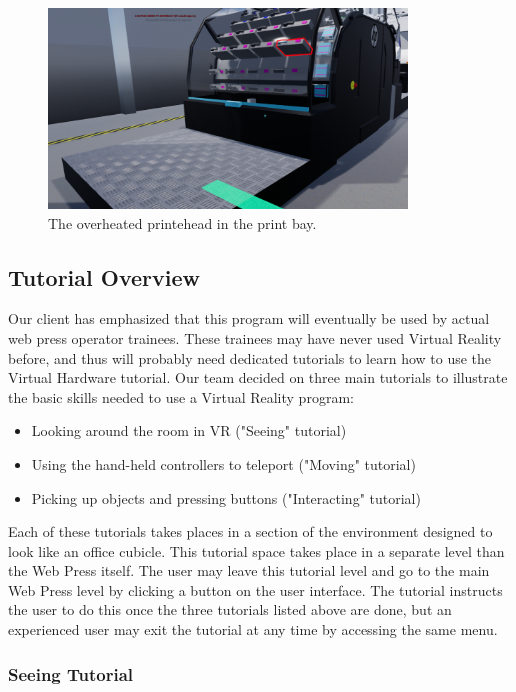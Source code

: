 \documentclass[onecolumn, draftclsnofoot,10pt, compsoc]{IEEEtran}
\begin{document}
 
 \begin{figure}[ht!]
     \centering
     \includegraphics[width=0.85\textwidth]{3.png}
     \caption{The overheated printehead in the print bay.}
     \label{fig:overheat}
 \end{figure}


\subsection{Tutorial Overview}

Our client has emphasized that this program will eventually be used by actual web press operator trainees. These trainees may have never used Virtual Reality before, and thus will probably need dedicated tutorials to learn how to use the Virtual Hardware tutorial. Our team decided on three main tutorials to illustrate the basic skills needed to use a Virtual Reality program:

\begin{itemize}
    \item Looking around the room in VR ("Seeing" tutorial)
    \item Using the hand-held controllers to teleport ("Moving" tutorial)
    \item Picking up objects and pressing buttons ("Interacting" tutorial)
\end{itemize}

Each of these tutorials takes places in a section of the environment designed to look like an office cubicle. This tutorial space takes place in a separate level than the Web Press itself. The user may leave this tutorial level and go to the main Web Press level by clicking a button on the user interface. The tutorial instructs the user to do this once the three tutorials listed above are done, but an experienced user may exit the tutorial at any time by accessing the same menu.

\subsubsection{Seeing Tutorial}
\end{document}

